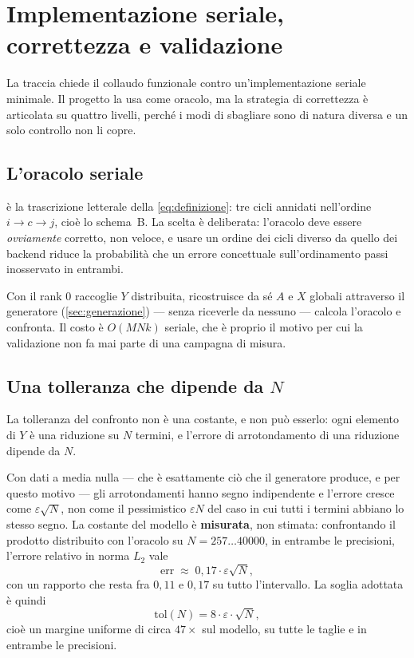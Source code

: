 \chapter{Implementazione seriale, correttezza e validazione}\label{cap:seriale}

La traccia chiede il collaudo funzionale contro un'implementazione seriale
minimale. Il progetto la usa come oracolo, ma la strategia di correttezza \`e
articolata su quattro livelli, perch\'e i modi di sbagliare sono di natura
diversa e un solo controllo non li copre.

\section{L'oracolo seriale}

 \`e la trascrizione letterale della
\cref{eq:definizione}: tre cicli annidati nell'ordine $i \to c \to j$, cio\`e lo
schema~B. La scelta \`e deliberata: l'oracolo deve essere \emph{ovviamente}
corretto, non veloce, e usare un ordine dei cicli diverso da quello dei backend
riduce la probabilit\`a che un errore concettuale sull'ordinamento passi
inosservato in entrambi.

Con  il rank 0 raccoglie $Y$ distribuita, ricostruisce da s\'e $A$ e
$X$ globali attraverso il generatore (\cref{sec:generazione}) --- senza
riceverle da nessuno --- calcola l'oracolo e confronta. Il costo \`e $O(MNk)$
seriale, che \`e proprio il motivo per cui la validazione non fa mai parte di una
campagna di misura.

\section{Una tolleranza che dipende da $N$}
\label{sec:tolleranza}

La tolleranza del confronto non \`e una costante, e non pu\`o esserlo: ogni
elemento di $Y$ \`e una riduzione su $N$ termini, e l'errore di arrotondamento di
una riduzione dipende da $N$.

Con dati a media nulla --- che \`e esattamente ci\`o che il generatore produce, e
per questo motivo --- gli arrotondamenti hanno segno indipendente e l'errore
cresce come $\varepsilon\sqrt{N}$, non come il pessimistico $\varepsilon N$ del
caso in cui tutti i termini abbiano lo stesso segno. La costante del modello \`e
\textbf{misurata}, non stimata: confrontando il prodotto distribuito con l'oracolo
su $N = 257 \dots \num{40000}$, in entrambe le precisioni, l'errore relativo in
norma $L_2$ vale
\begin{equation}
  \mathrm{err} \;\approx\; 0{,}17 \cdot \varepsilon \sqrt{N},
\end{equation}
con un rapporto che resta fra $0{,}11$ e $0{,}17$ su tutto l'intervallo. La
soglia adottata \`e quindi
\begin{equation}
  \mathrm{tol}(N) = 8 \cdot \varepsilon \cdot \sqrt{N},
  \label{eq:tolleranza}
\end{equation}
cio\`e un margine uniforme di circa $47\times$ sul modello, su tutte le taglie e
in entrambe le precisioni.

